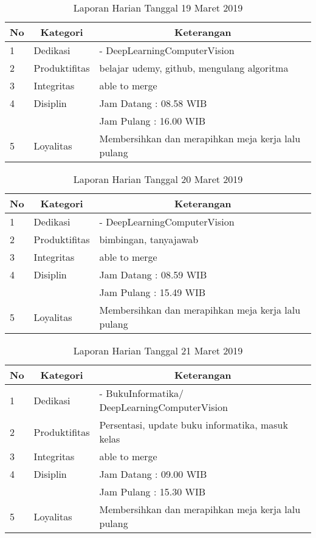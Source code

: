 \begin{table}[htp]
\caption{Laporan Harian Tanggal 19 Maret 2019}
\label{tab:lh190319}
\begin{tabular}{|l|l|l|}
\hline
\textbf{No} & \multicolumn{1}{c|}{\textbf{Kategori}} & \multicolumn{1}{c|}{\textbf{Keterangan}} \\ \hline
1 & Dedikasi & -  DeepLearningComputerVision \\ \hline
2 & Produktifitas & belajar udemy, github, mengulang algoritma \\
3 & Integritas & able to merge \\ \hline
4 & Disiplin & Jam Datang : 08.58 WIB \\
 &  & Jam Pulang : 16.00 WIB \\ \hline
5 & Loyalitas & Membersihkan dan merapihkan meja kerja lalu pulang  \\ \hline
\end{tabular}
\end{table}

\begin{table}[htp]
\caption{Laporan Harian Tanggal 20 Maret 2019}
\label{tab:lh200319}
\begin{tabular}{|l|l|l|}
\hline
\textbf{No} & \multicolumn{1}{c|}{\textbf{Kategori}} & \multicolumn{1}{c|}{\textbf{Keterangan}} \\ \hline
1 & Dedikasi & -  DeepLearningComputerVision \\ \hline
2 & Produktifitas & bimbingan, tanyajawab \\
3 & Integritas & able to merge \\ \hline
4 & Disiplin & Jam Datang : 08.59 WIB \\
 &  & Jam Pulang : 15.49 WIB \\ \hline
5 & Loyalitas & Membersihkan dan merapihkan meja kerja lalu pulang  \\ \hline
\end{tabular}
\end{table}

\begin{table}[htp]
\caption{Laporan Harian Tanggal 21 Maret 2019}
\label{tab:lh210319}
\begin{tabular}{|l|l|l|}
\hline
\textbf{No} & \multicolumn{1}{c|}{\textbf{Kategori}} & \multicolumn{1}{c|}{\textbf{Keterangan}} \\ \hline
1 & Dedikasi & - BukuInformatika/ DeepLearningComputerVision \\ \hline
2 & Produktifitas & Persentasi, update buku informatika, masuk kelas  \\
3 & Integritas & able to merge \\ \hline
4 & Disiplin & Jam Datang : 09.00 WIB \\
 &  & Jam Pulang : 15.30 WIB \\ \hline
5 & Loyalitas & Membersihkan dan merapihkan meja kerja lalu pulang  \\ \hline
\end{tabular}
\end{table}
